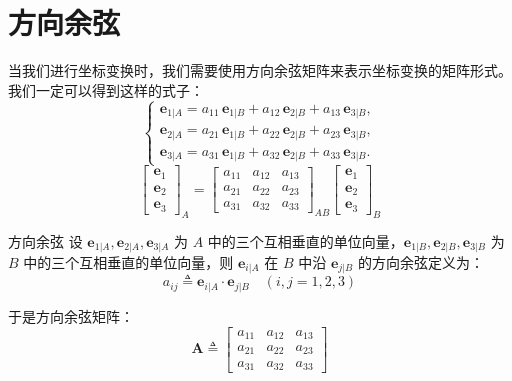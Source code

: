 \section{方向余弦}
当我们进行坐标变换时，我们需要使用方向余弦矩阵来表示坐标变换的矩阵形式。
我们一定可以得到这样的式子：
\begin{equation}
    \left\{\begin{array}{l}
\mathbf{e}_{1|A} = a_{11}\,\mathbf{e}_{1|B} + a_{12}\,\mathbf{e}_{2|B} + a_{13}\,\mathbf{e}_{3|B},\\
\mathbf{e}_{2|A} = a_{21}\,\mathbf{e}_{1|B} + a_{22}\,\mathbf{e}_{2|B} + a_{23}\,\mathbf{e}_{3|B},\\
\mathbf{e}_{3|A} = a_{31}\,\mathbf{e}_{1|B} + a_{32}\,\mathbf{e}_{2|B} + a_{33}\,\mathbf{e}_{3|B}.
\end{array}\right.
\end{equation}
\begin{equation}
    \begin{bmatrix}\boldsymbol{e}_{1}\\\boldsymbol{e}_{2}\\\boldsymbol{e}_{3}\end{bmatrix}_A=\begin{bmatrix}a_{11}&a_{12}&a_{13}\\a_{21}&a_{22}&a_{23}\\a_{31}&a_{32}&a_{33}\end{bmatrix}_{AB}\begin{bmatrix}\boldsymbol{e}_{1}\\\boldsymbol{e}_{2}\\\boldsymbol{e}_{3}\end{bmatrix}_B
\end{equation}
\begin{mydefinition}{方向余弦}
设 $\boldsymbol{e}_{1|A}, \boldsymbol{e}_{2|A}, \boldsymbol{e}_{3|A}$ 为 $A$ 中的三个互相垂直的单位向量，$\boldsymbol{e}_{1|B}, \boldsymbol{e}_{2|B}, \boldsymbol{e}_{3|B}$ 为 $B$ 中的三个互相垂直的单位向量，则 $\boldsymbol{e}_{i|A}$ 在 $B$ 中沿 $\boldsymbol{e}_{j|B}$ 的方向余弦定义为：
\begin{equation}
    a_{ij}\triangleq\mathbf{e}_{i|A}\cdot\mathbf{e}_{j|B}\quad(i,j=1,2,3)
    \label{eq:方向余弦的定义}
\end{equation}


\end{mydefinition}
于是方向余弦矩阵：
\begin{equation}
    \label{eq:direction_cosine_matrix}
    \boldsymbol{A} \triangleq
    \begin{bmatrix}
        a_{11} & a_{12} & a_{13} \\
        a_{21} & a_{22} & a_{23} \\
        a_{31} & a_{32} & a_{33}
    \end{bmatrix}
\end{equation}

